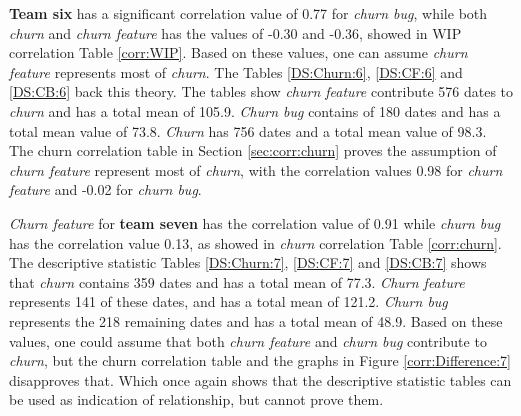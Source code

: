 \documentclass[UKenglish]{ifimaster}  %
\begin{document}
\textbf{Team six} has a significant correlation value of 0.77 for \textit{churn bug}, while both \textit{churn} and \textit{churn feature} has the values of -0.30 and -0.36, showed in WIP correlation Table \ref{corr:WIP}. Based on these values, one can assume \textit{churn feature} represents most of \textit{churn}. The Tables \ref{DS:Churn:6}, \ref{DS:CF:6} and \ref{DS:CB:6} back this theory. The tables show \textit{churn feature} contribute 576 dates to \textit{churn} and has a total mean of 105.9. \textit{Churn bug} contains of 180 dates and has a total mean value of 73.8. \textit{Churn} has 756 dates and a total mean value of 98.3.  The churn correlation table in Section \ref{sec:corr:churn} proves the assumption of \textit{churn feature} represent most of \textit{churn}, with the correlation values 0.98 for  \textit{churn feature} and -0.02 for \textit{churn bug}.

\textit{Churn feature} for \textbf{team seven} has the correlation value of 0.91 while \textit{churn bug} has the correlation value 0.13, as showed in \textit{churn} correlation Table \ref{corr:churn}. The descriptive statistic Tables \ref{DS:Churn:7}, \ref{DS:CF:7} and \ref{DS:CB:7} shows that \textit{churn} contains 359 dates and has a total mean of 77.3.  \textit{Churn feature} represents 141 of these dates, and has a total mean of 121.2. \textit{Churn bug} represents the 218 remaining dates and has a total mean of 48.9. Based on these values, one could assume that both  \textit{churn feature} and  \textit{churn bug} contribute to  \textit{churn}, but the churn correlation table  and  the graphs in Figure \ref{corr:Difference:7} disapproves that. Which once again shows that the descriptive statistic tables can be used as indication of relationship, but cannot prove them.
\end{document}
